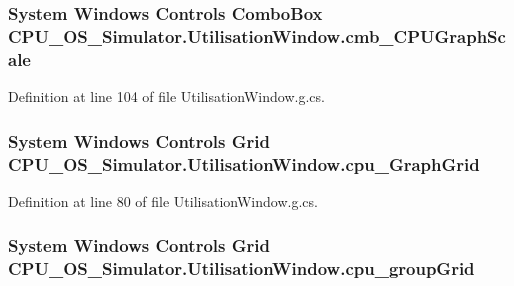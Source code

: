 \subsubsection[{cmb\+\_\+\+C\+P\+U\+Graph\+Scale}]{\setlength{\rightskip}{0pt plus 5cm}System Windows Controls Combo\+Box C\+P\+U\+\_\+\+O\+S\+\_\+\+Simulator.\+Utilisation\+Window.\+cmb\+\_\+\+C\+P\+U\+Graph\+Scale\hspace{0.3cm}{\ttfamily [package]}}\label{class_c_p_u___o_s___simulator_1_1_utilisation_window_af45ffcdbf17ecf13e3b63a23352fc842}


Definition at line 104 of file Utilisation\+Window.\+g.\+cs.

\hypertarget{class_c_p_u___o_s___simulator_1_1_utilisation_window_a89970f438dcb79f852cd63ee558c9388}{}
\subsubsection[{cpu\+\_\+\+Graph\+Grid}]{\setlength{\rightskip}{0pt plus 5cm}System Windows Controls Grid C\+P\+U\+\_\+\+O\+S\+\_\+\+Simulator.\+Utilisation\+Window.\+cpu\+\_\+\+Graph\+Grid\hspace{0.3cm}{\ttfamily [package]}}\label{class_c_p_u___o_s___simulator_1_1_utilisation_window_a89970f438dcb79f852cd63ee558c9388}


Definition at line 80 of file Utilisation\+Window.\+g.\+cs.

\hypertarget{class_c_p_u___o_s___simulator_1_1_utilisation_window_a46aa403e5d65d2a7fb4d2f242ab34d57}{}
\subsubsection[{cpu\+\_\+group\+Grid}]{\setlength{\rightskip}{0pt plus 5cm}System Windows Controls Grid C\+P\+U\+\_\+\+O\+S\+\_\+\+Simulator.\+Utilisation\+Window.\+cpu\+\_\+group\+Grid\hspace{0.3cm}{\ttfamily [package]}}\label{class_c_p_u___o_s___simulator_1_1_utilisation_window_a46aa403e5d65d2a7fb4d2f242ab34d57}


